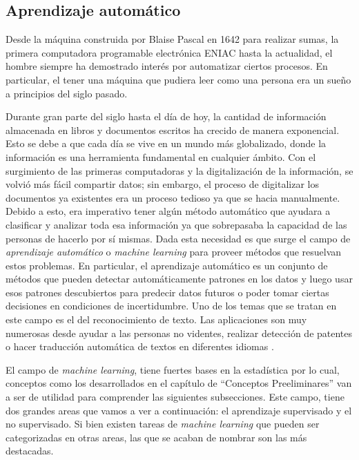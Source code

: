 \subsection{Aprendizaje automático}

	Desde la máquina construida por Blaise Pascal en 1642 para realizar sumas, la primera computadora programable electrónica ENIAC hasta la actualidad, el hombre siempre ha demostrado interés por automatizar ciertos procesos. En particular, el tener una máquina que pudiera leer como una persona era un sueño a principios del siglo pasado.
	
	Durante gran parte del siglo  hasta el día de hoy, la cantidad de información almacenada en libros y documentos escritos ha crecido de manera exponencial. Esto se debe a que cada día se vive en un mundo más globalizado, donde la información es una herramienta fundamental en cualquier ámbito. Con el surgimiento de las primeras computadoras y la digitalización de la información, se volvió más fácil compartir datos; sin embargo, el proceso de digitalizar los documentos ya existentes era un proceso tedioso ya que se hacia manualmente. Debido a esto, era imperativo tener algún método automático que ayudara a clasificar y analizar toda esa información ya que sobrepasaba la capacidad de las personas de hacerlo por sí mismas. Dada esta necesidad es que surge el campo de \textit{aprendizaje automático} o \textit{machine learning} para proveer métodos que resuelvan estos problemas. En particular, el aprendizaje automático es un conjunto de métodos que pueden detectar automáticamente patrones en los datos y luego usar esos patrones descubiertos para predecir datos futuros o poder tomar ciertas decisiones en condiciones de incertidumbre. Uno de los temas que se tratan en este campo es el del reconocimiento de texto. Las aplicaciones son muy numerosas desde ayudar a las personas no videntes, realizar detección de patentes o hacer traducción automática de textos en diferentes idiomas \cite{Optelec, DAB, WordLens}.
	 
	 El campo de \textit{machine learning}, tiene fuertes bases en la estadística por lo cual, conceptos como los desarrollados en el capítulo de ``Conceptos Preeliminares'' van a ser de utilidad para comprender las siguientes subsecciones. Este campo, tiene dos grandes areas que vamos a ver a continuación: el aprendizaje supervisado y el no supervisado. Si bien existen tareas de \textit{machine learning} que pueden ser categorizadas en otras areas, las que se acaban de nombrar son las más destacadas.
	
